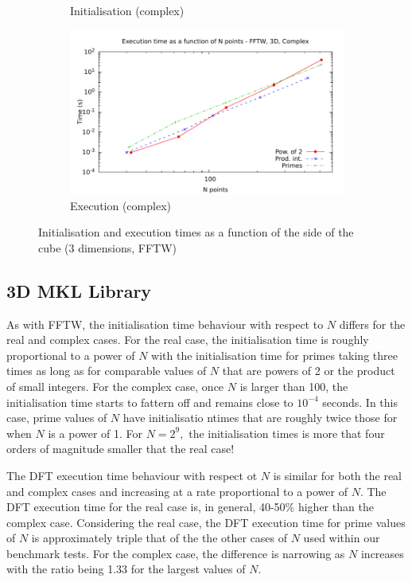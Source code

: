 \documentclass[12pt, a4paper]{article} \setlength{\textheight}{24cm}
\begin{document}
\begin{figure}[H]
\begin{subfigure}{.5\textwidth}
    \caption{Initialisation (complex)}
    \label{3DFFTWCI}
  \end{subfigure}%
  \begin{subfigure}{.5\textwidth}
    \centering
    \includegraphics[width=.9\linewidth]{graphs/3d-fftw-exec-c.pdf}
    \caption{Execution (complex)}
    \label{3DFFTWC}
  \end{subfigure}
  \caption{Initialisation and execution times as a function of the
    side of the cube (3 dimensions, FFTW)}
  \label{3DFFTW}
\end{figure}


\subsection{3D MKL Library}
As with FFTW, the initialisation time behaviour with respect to $N$
differs for the real and complex cases. For the real case, the
initialisation time is roughly proportional to a power of $N$ with the
initialisation time for primes taking three times as long as for
comparable values of $N$ that are powers of 2 or the product of small
integers. For the complex case, once $N$ is larger than 100, the
initialisation time starts to fattern off and remains close to
$10^{-4}$ seconds. In this case, prime values of $N$ have
initialisatio ntimes that are roughly twice those for when $N$ is a
power of 1. For $N=2^9,$ the initialisation times is more that four
orders of magnitude smaller that the real case!

The DFT execution time behaviour with respect ot $N$ is similar for
both the real and complex cases and increasing at a rate proportional
to a power of $N.$ The DFT execution time for the real case is, in
general, 40-50\% higher than the complex case. Considering the real
case, the DFT execution time for prime values of $N$ is approximately
triple that of the the other cases of $N$ used within our benchmark
tests. For the complex case, the difference is narrowing as $N$
increases with the ratio being 1.33 for the largest values of $N.$
\end{document}
